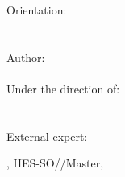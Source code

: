 {\begin{flushright}
        {
        \LARGE Orientation: \Orientation\\[0.5cm] %
        ~\\[1cm]
        }
        {
            \Huge \bfseries %
            \ThesisTitle \\[1.5cm] %
        }
        {
            \large
            Author:\\[-0.3cm] %
            \Huge \Author \\[0.8cm] %
        }
        {
            \large
            Under the direction of: \\ %
            \Advisor \\ %
            \AdvisorResearchUnit \\[0.5cm] %
        }
        {
            \large
            External expert: \\
            \Expert %
        }
        \vfill %
        
        {\large \Place, HES-SO//Master, \Date} %
        
    \end{flushright}
}
\restoregeometry %
